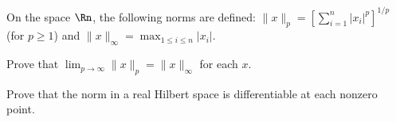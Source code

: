 \begin{alist}
\item On the space $\Rn$, the following norms are defined:
$\|x\|_p=[\sum_{i=1}^n|x_i|^p]^{1/p}$ (for $p\geq 1$) and 
$\|x\|_{\infty}=\max_{1\leq i\leq n}|x_i|$.

Prove that $\lim_{p\rightarrow \infty} \|x\|_p=\|x\|_{\infty}$ for 
each $x$. 
\item Prove that the norm in a real Hilbert space is differentiable
at each nonzero point.
\end{alist}

